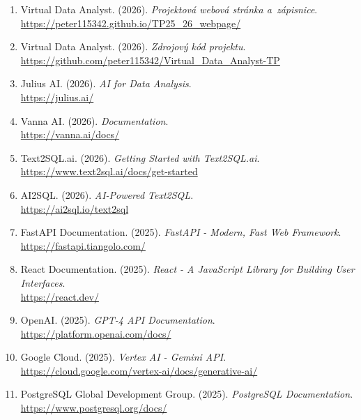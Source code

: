 \documentclass[a4paper, 12pt]{article}
\begin{document}
\begin{enumerate}
    \item Virtual Data Analyst. (2026). \textit{Projektová webová stránka a~zápisnice}. \\
    \url{https://peter115342.github.io/TP25_26_webpage/}

    \item Virtual Data Analyst. (2026). \textit{Zdrojový kód projektu}. \\
    \url{https://github.com/peter115342/Virtual_Data_Analyst-TP}

    \item Julius AI. (2026). \textit{AI for Data Analysis}. \\
    \url{https://julius.ai/}

    \item Vanna AI. (2026). \textit{Documentation}. \\
    \url{https://vanna.ai/docs/}

    \item Text2SQL.ai. (2026). \textit{Getting Started with Text2SQL.ai}. \\
    \url{https://www.text2sql.ai/docs/get-started}

    \item AI2SQL. (2026). \textit{AI-Powered Text2SQL}. \\
    \url{https://ai2sql.io/text2sql}

    \item FastAPI Documentation. (2025). \textit{FastAPI - Modern, Fast Web Framework}. \\
    \url{https://fastapi.tiangolo.com/}
    
    \item React Documentation. (2025). \textit{React - A JavaScript Library for Building User Interfaces}. \\
    \url{https://react.dev/}
    
    \item OpenAI. (2025). \textit{GPT-4 API Documentation}. \\
    \url{https://platform.openai.com/docs/}
    
    \item Google Cloud. (2025). \textit{Vertex AI - Gemini API}. \\
    \url{https://cloud.google.com/vertex-ai/docs/generative-ai/}
    
    \item PostgreSQL Global Development Group. (2025). \textit{PostgreSQL Documentation}. \\
    \url{https://www.postgresql.org/docs/}
    

\end{enumerate}
\end{document}
